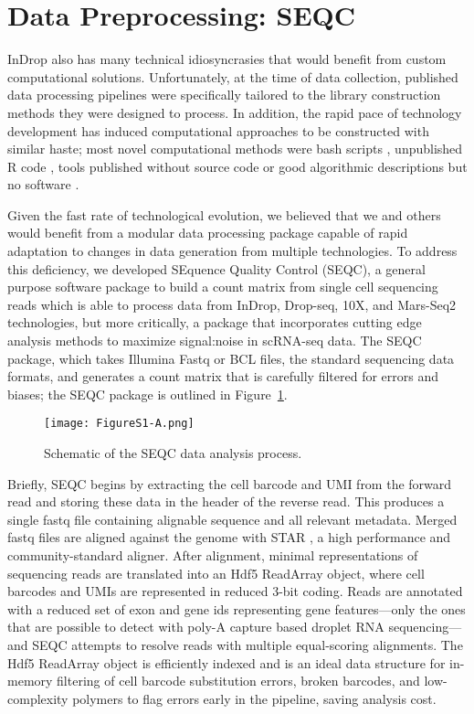 \section{Data Preprocessing: SEQC}

InDrop also has many technical idiosyncrasies that would benefit from custom computational solutions. 
Unfortunately, at the time of data collection, published data processing pipelines were specifically tailored to the library construction methods they were designed to process. 
In addition, the rapid pace of technology development has induced computational approaches to be constructed with similar haste; most novel computational methods were bash scripts \citep{Shalek2013,Shalek2014}, unpublished R code \citep{Jaitin2014}, tools published without source code \citep{Macosko2015} or good algorithmic descriptions but no software \citep{Klein2015}. 

Given the fast rate of technological evolution, we believed that we and others would benefit from a modular data processing package capable of rapid adaptation to changes in data generation from multiple technologies.
To address this deficiency, we developed SEquence Quality Control (SEQC), a general purpose software package to build a count matrix from single cell sequencing reads which is able to process data from InDrop, Drop-seq, 10X, and Mars-Seq2 technologies, but more critically, a package that incorporates cutting edge analysis methods to maximize signal:noise in scRNA-seq data. 
The SEQC package, which takes Illumina Fastq or BCL files, the standard sequencing data formats, and generates a count matrix that is carefully filtered for errors and biases; the SEQC package is outlined in Figure~\ref{fig:s1a}. 

\begin{figure}
\centering
\texttt{[image: FigureS1-A.png]}
\caption{Schematic of the SEQC data analysis process.}
\label{fig:s1a}
\end{figure} 

Briefly, SEQC begins by extracting the cell barcode and UMI from the forward read and storing these data in the header of the reverse read.
This produces a single fastq file containing alignable sequence and all relevant metadata.
Merged fastq files are aligned against the genome with STAR \citep{Dobin2013}, a high performance and community-standard aligner. 
After alignment, minimal representations of sequencing reads are translated into an Hdf5 {\mono ReadArray} object, where cell barcodes and UMIs are represented in reduced 3-bit coding. 
Reads are annotated with a reduced set of exon and gene ids representing gene features---only the ones that are possible to detect with poly-A capture based droplet RNA sequencing---and SEQC attempts to resolve reads with multiple equal-scoring alignments.
The Hdf5 {\mono ReadArray} object is efficiently indexed and is an ideal data structure for in-memory filtering of cell barcode substitution errors, broken barcodes, and low-complexity polymers to flag errors early in the pipeline, saving analysis cost.

